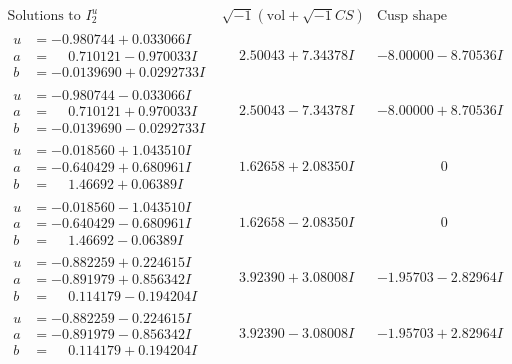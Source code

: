 \documentclass[1p]{elsarticle_modified}
\theoremstyle{definition}
\newcommand{\I}{\sqrt{-1}}
\begin{document}
$$\begin{array}{c|c|c}  
\text{Solutions to }I^u_{2}& \I (\text{vol} + \sqrt{-1}CS) & \text{Cusp shape}\\
 \hline 
\begin{aligned}
u &= -0.980744 + 0.033066 I \\
a &= \phantom{-}0.710121 - 0.970033 I \\
b &= -0.0139690 + 0.0292733 I\end{aligned}
 & \phantom{-}2.50043 + 7.34378 I & -8.00000 - 8.70536 I \\ \hline\begin{aligned}
u &= -0.980744 - 0.033066 I \\
a &= \phantom{-}0.710121 + 0.970033 I \\
b &= -0.0139690 - 0.0292733 I\end{aligned}
 & \phantom{-}2.50043 - 7.34378 I & -8.00000 + 8.70536 I \\ \hline\begin{aligned}
u &= -0.018560 + 1.043510 I \\
a &= -0.640429 + 0.680961 I \\
b &= \phantom{-}1.46692 + 0.06389 I\end{aligned}
 & \phantom{-}1.62658 + 2.08350 I & \phantom{-0.000000 } 0 \\ \hline\begin{aligned}
u &= -0.018560 - 1.043510 I \\
a &= -0.640429 - 0.680961 I \\
b &= \phantom{-}1.46692 - 0.06389 I\end{aligned}
 & \phantom{-}1.62658 - 2.08350 I & \phantom{-0.000000 } 0 \\ \hline\begin{aligned}
u &= -0.882259 + 0.224615 I \\
a &= -0.891979 + 0.856342 I \\
b &= \phantom{-}0.114179 - 0.194204 I\end{aligned}
 & \phantom{-}3.92390 + 3.08008 I & -1.95703 - 2.82964 I \\ \hline\begin{aligned}
u &= -0.882259 - 0.224615 I \\
a &= -0.891979 - 0.856342 I \\
b &= \phantom{-}0.114179 + 0.194204 I\end{aligned}
 & \phantom{-}3.92390 - 3.08008 I & -1.95703 + 2.82964 I \\ \hline\begin{aligned}

\end{aligned}
\end{array}$$
\end{document}
